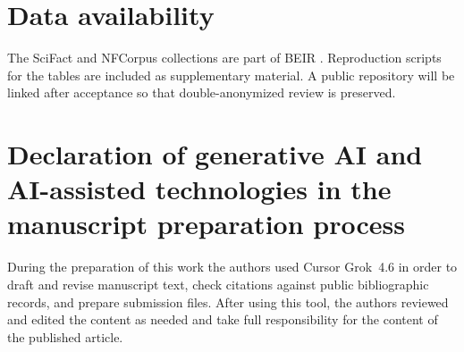 \documentclass[preprint,12pt,authoryear]{elsarticle}
\begin{document}
\section*{Data availability}
The SciFact and NFCorpus collections are part of BEIR \citep{thakur2021beirdataset}. Reproduction scripts for the tables are included as supplementary material. A public repository will be linked after acceptance so that double-anonymized review is preserved.

\section*{Declaration of generative AI and AI-assisted technologies in the manuscript preparation process}
During the preparation of this work the authors used Cursor Grok~4.6 in order to draft and revise manuscript text, check citations against public bibliographic records, and prepare submission files. After using this tool, the authors reviewed and edited the content as needed and take full responsibility for the content of the published article.



\end{document}
